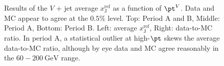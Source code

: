 \documentclass[NOTE, atlasdraft=true, texlive=2016, USenglish]{\ATLASLATEXPATH atlasdoc}
\begin{document}
%
%

\begin{figure}[htbp]
	\centering
	\\
	\\
	\caption{Results of the $V$ + jet average $x_{\text{J}}^{\text{ref}}$ as a function of $\pt^{V}$. Data and MC appear to agree at the $0.5\%$ level. Top: Period A and B, Middle: Period A, Bottom: Period B. Left: average $x_{\text{J}}^{\text{ref}}$, Right: data-to-MC ratio. In period A, a statistical outlier at high-$\pt$ skews the average data-to-MC ratio, although by eye data and MC agree reasonably in the $60-\SI{200}{\GeV}$ range.}
	\label{fig:v_xjref_dataOverMC_pT}
\end{figure}
\end{document}
